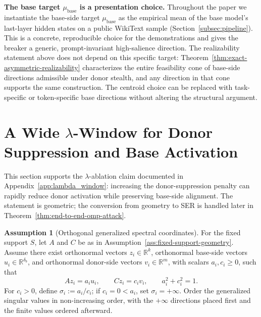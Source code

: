\documentclass{article}
\theoremstyle{plain}
\theoremstyle{definition}
\newtheorem{assumption}[theorem]{Assumption}
\theoremstyle{remark}
\begin{document}
\noindent\textbf{The base target $\mu_{\text{base}}$ is a presentation choice.}
Throughout the paper we instantiate the base-side target $\mu_{\text{base}}$ as the empirical mean of the base model's last-layer hidden states on a public WikiText sample (Section~\ref{subsec:pipeline}). This is a concrete, reproducible choice for the demonstrations and gives the breaker a generic, prompt-invariant high-salience direction. The realizability statement above does not depend on this specific target: Theorem~\ref{thm:exact-asymmetric-realizability} characterizes the entire feasibility cone of base-side directions admissible under donor stealth, and any direction in that cone supports the same construction. The centroid choice can be replaced with task-specific or token-specific base directions without altering the structural argument.

\section{A Wide $\lambda$-Window for Donor Suppression and Base Activation}
\label{app:lambda-window}

This section supports the $\lambda$-ablation claim documented in Appendix~\ref{app:lambda_window}: increasing the donor-suppression penalty can rapidly reduce donor activation while preserving base-side alignment. The statement is geometric; the conversion from geometry to SER is handled later in Theorem~\ref{thm:end-to-end-omp-attack}.

\begin{assumption}[Orthogonal generalized spectral coordinates]
\label{ass:orthogonal-gsvd}
For the fixed support $S$, let $A$ and $C$ be as in Assumption~\ref{ass:fixed-support-geometry}. Assume there exist orthonormal vectors $z_i\in\mathbb{R}^{k}$, orthonormal base-side vectors $u_i\in\mathbb{R}^{\delta_b}$, and orthonormal donor-side vectors $v_i\in\mathbb{R}^{m}$, with scalars $a_i,c_i\ge 0$, such that
\[
Az_i=a_i u_i,
\qquad
Cz_i=c_i v_i,
\qquad
a_i^2+c_i^2=1.
\]
For $c_i>0$, define $\sigma_i:=a_i/c_i$; if $c_i=0<a_i$, set $\sigma_i=+\infty$. Order the generalized singular values in non-increasing order, with the $+\infty$ directions placed first and the finite values ordered afterward.
\end{assumption}
\end{document}
